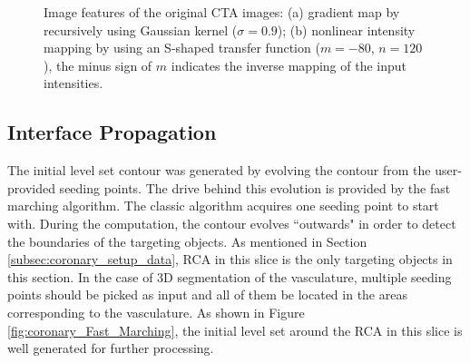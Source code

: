 \begin{figure}[!tb]
\centering
{}
\hfil
{}
\caption{Image features of the original CTA images: (a) gradient map by recursively using Gaussian kernel ($\sigma = 0.9$); (b) nonlinear intensity mapping by using an S-shaped transfer function ($m = -80$, $n = 120$), the minus sign of $m$ indicates the inverse mapping of the input intensities.}%
\label{fig:coronary_image_features}
\end{figure}


\subsection{Interface Propagation}

The initial level set contour was generated by evolving the contour from the user-provided seeding points.
The drive behind this evolution is provided by the fast marching algorithm.
The classic algorithm acquires one seeding point to start with.
During the computation, the contour evolves ``outwards" in order to detect the boundaries of the targeting objects.
As mentioned in Section \ref{subsec:coronary_setup_data}, RCA in this slice is the only targeting objects in this section.
In the case of 3D segmentation of the vasculature, multiple seeding points should be picked as input and all of them be located in the areas corresponding to the vasculature.
As shown in Figure \ref{fig:coronary_Fast_Marching}, the initial level set around the RCA in this slice is well generated for further processing.


